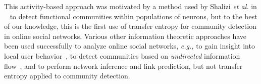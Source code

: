 

This activity-based approach was motivated by a method used by Shalizi \emph{et al.} in ~\cite{shalizi2007discovering} to detect functional communities within populations of neurons, but to the best of our knowledge, this is the first use of transfer entropy for community detection in online social networks. Various other information theoretic approaches have been used successfully to analyze online social networks, \emph{e.g.,} to gain insight into local user behavior~\cite{darmon2013understanding}, to detect communities based on \emph{undirected} information flow~\cite{darmon2013detecting}, and to perform network inference and link prediction\cite{ver2012information}, but not transfer entropy applied to community detection.


